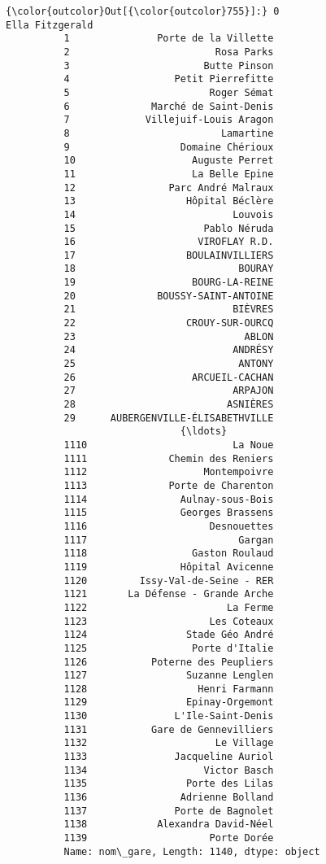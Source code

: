\documentclass[11pt]{article}
\begin{document}
\begin{Verbatim}[commandchars=\\\{\}]
{\color{outcolor}Out[{\color{outcolor}755}]:} 0                    Ella Fitzgerald
          1               Porte de la Villette
          2                         Rosa Parks
          3                       Butte Pinson
          4                  Petit Pierrefitte
          5                        Roger Sémat
          6              Marché de Saint-Denis
          7             Villejuif-Louis Aragon
          8                          Lamartine
          9                   Domaine Chérioux
          10                    Auguste Perret
          11                    La Belle Epine
          12                Parc André Malraux
          13                   Hôpital Béclère
          14                           Louvois
          15                      Pablo Néruda
          16                     VIROFLAY R.D.
          17                   BOULAINVILLIERS
          18                            BOURAY
          19                    BOURG-LA-REINE
          20              BOUSSY-SAINT-ANTOINE
          21                           BIÈVRES
          22                   CROUY-SUR-OURCQ
          23                             ABLON
          24                           ANDRÉSY
          25                            ANTONY
          26                    ARCUEIL-CACHAN
          27                           ARPAJON
          28                          ASNIÈRES
          29      AUBERGENVILLE-ÉLISABETHVILLE
                              {\ldots}             
          1110                         La Noue
          1111              Chemin des Reniers
          1112                    Montempoivre
          1113              Porte de Charenton
          1114                Aulnay-sous-Bois
          1115                Georges Brassens
          1116                     Desnouettes
          1117                          Gargan
          1118                  Gaston Roulaud
          1119                Hôpital Avicenne
          1120         Issy-Val-de-Seine - RER
          1121       La Défense - Grande Arche
          1122                        La Ferme
          1123                     Les Coteaux
          1124                 Stade Géo André
          1125                  Porte d'Italie
          1126           Poterne des Peupliers
          1127                 Suzanne Lenglen
          1128                   Henri Farmann
          1129                 Epinay-Orgemont
          1130               L'Ile-Saint-Denis
          1131           Gare de Gennevilliers
          1132                      Le Village
          1133               Jacqueline Auriol
          1134                    Victor Basch
          1135                 Porte des Lilas
          1136                Adrienne Bolland
          1137               Porte de Bagnolet
          1138            Alexandra David-Néel
          1139                     Porte Dorée
          Name: nom\_gare, Length: 1140, dtype: object
\end{Verbatim}
            
\end{document}
